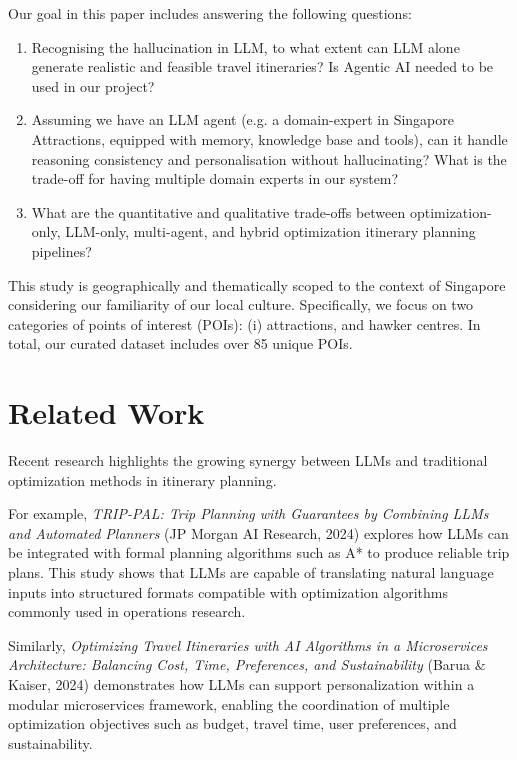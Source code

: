 \documentclass{ecai}
\begin{document}
Our goal in this paper includes answering the following questions: 
\begin{enumerate}
    \item Recognising the hallucination in LLM, to what extent can LLM alone generate realistic and feasible travel itineraries? Is Agentic AI needed to be used in our project?
    \item Assuming we have an LLM agent (e.g. a domain-expert in Singapore Attractions, equipped with memory, knowledge base and tools), can it handle reasoning consistency and personalisation without hallucinating? What is the trade-off for having multiple domain experts in our system?
    \item What are the quantitative and qualitative trade-offs between optimization-only, LLM-only, multi-agent, and hybrid optimization itinerary planning pipelines?
\end{enumerate}

This study is geographically and thematically scoped to the context of Singapore considering our familiarity of our local culture. Specifically, we focus on two categories of points of interest (POIs): (i) attractions, and hawker centres. In total, our curated dataset includes over 85 unique POIs.


\section{Related Work}
Recent research highlights the growing synergy between LLMs and traditional optimization methods in itinerary planning.

For example, \textit{TRIP-PAL: Trip Planning with Guarantees by Combining LLMs and Automated Planners} (JP Morgan AI Research, 2024) explores how LLMs can be integrated with formal planning algorithms such as A* to produce reliable trip plans. This study shows that LLMs are capable of translating natural language inputs into structured formats compatible with optimization algorithms commonly used in operations research.

Similarly, \textit{Optimizing Travel Itineraries with AI Algorithms in a Microservices Architecture: Balancing Cost, Time, Preferences, and Sustainability} (Barua \& Kaiser, 2024) demonstrates how LLMs can support personalization within a modular microservices framework, enabling the coordination of multiple optimization objectives such as budget, travel time, user preferences, and sustainability.
\end{document}
